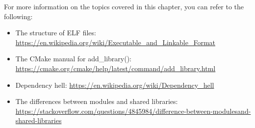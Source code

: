 For more information on the topics covered in this chapter, you can refer to the following:

\begin{itemize}
\item
The structure of ELF files: \url{https://en.wikipedia.org/wiki/Executable_and_Linkable_Format}

\item
The CMake manual for add\_library(): \url{https://cmake.org/cmake/help/latest/command/add_library.html}

\item
Dependency hell: \url{https://en.wikipedia.org/wiki/Dependency_hell}

\item
The differences between modules and shared libraries: \url{https://stackoverflow.com/questions/4845984/difference-between-modulesand-shared-libraries}
\end{itemize}
